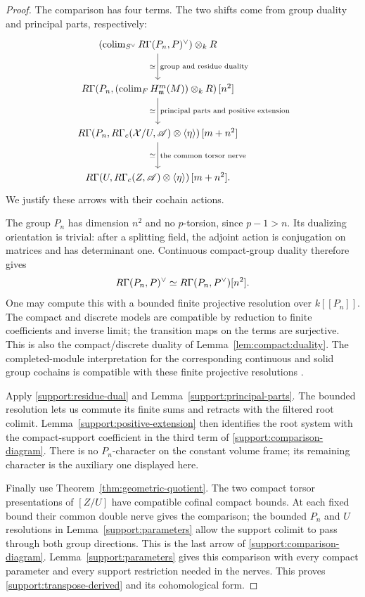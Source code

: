 \begin{proof}
The comparison has four terms.  The two shifts come from group
duality and principal parts, respectively:
\begin{equation}\label{support:comparison-diagram}
\begin{tikzcd}[row sep=large]
 \left(\colim_{S^\vee}\RGamma(P_n,P)^\vee\right)\otimes_kR
   \arrow[d,"\text{group and residue duality}","\simeq"']\\
 \RGamma\!\left(P_n,
     (\colim_F H^m_{\mathfrak m}(M))\otimes_kR\right)[n^2]
   \arrow[d,"\text{principal parts and positive extension}","\simeq"']\\
 \RGamma\!\left(P_n,\RGamma_c(\mathcal X/U,\mathscr A)
                    \otimes\langle\eta\rangle\right)[m+n^2]
   \arrow[d,"\text{the common torsor nerve}","\simeq"']\\
 \RGamma\!\left(U,\RGamma_c(Z,\mathscr A)
                    \otimes\langle\eta\rangle\right)[m+n^2].
\end{tikzcd}
\end{equation}
We justify these arrows with their cochain actions.

The group $P_n$ has dimension $n^2$ and no $p$-torsion, since
$p-1>n$.  Its dualizing orientation is trivial: after a splitting
field, the adjoint action is conjugation on matrices and has
determinant one.  Continuous compact-group duality therefore gives
\[
 R\Gamma(P_n,P)^\vee
 \simeq R\Gamma(P_n,P^\vee)[n^2].
\]
One may compute this with a bounded finite projective resolution
over $k[[P_n]]$.  The compact and discrete models are compatible
by reduction to finite coefficients and inverse limit; the
transition maps on the terms are surjective.  This is also the
compact/discrete duality of Lemma~\ref{lem:compact:duality}.
The completed-module interpretation for the corresponding
continuous and solid group cochains is compatible with these
finite projective resolutions
\cite[Theorems~3.2 and~3.14(i), Proposition~3.21]{Tang}.

Apply \eqref{support:residue-dual} and
Lemma~\ref{support:principal-parts}.  The bounded resolution lets
us commute its finite sums and retracts with the filtered root
colimit.  Lemma~\ref{support:positive-extension} then identifies
the root system with the compact-support coefficient in the third
term of \eqref{support:comparison-diagram}.
There is no $P_n$-character on the constant volume frame; its
remaining character is the auxiliary one displayed here.

Finally use Theorem~\ref{thm:geometric-quotient}.  The two compact
torsor presentations of $[Z/U]$ have compatible cofinal compact
bounds.  At each fixed bound their common double nerve gives the
comparison; the bounded $P_n$ and $U$ resolutions in
Lemma~\ref{support:parameters} allow the support colimit to pass through
both group directions.  This is the last arrow of
\eqref{support:comparison-diagram}.
Lemma~\ref{support:parameters} gives this comparison with every
compact parameter and every support restriction needed in the
nerves.  This proves \eqref{support:transpose-derived} and its
cohomological form.


\end{proof}
